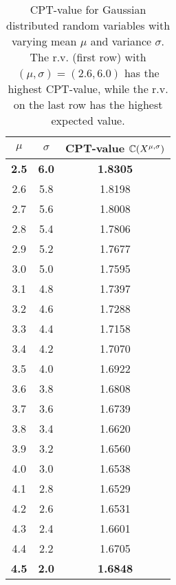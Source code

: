 \begin{table}
\centering
\begin{tabular}{|c|c|c|}
\toprule
$\mu$ & $\sigma$ & CPT-value $\mathbb{C}(X^{\mu,\sigma})$\\
\midrule
\textbf{2.5} & \textbf{6.0} & \textbf{1.8305}\\
2.6 & 5.8 & 1.8198\\
2.7 & 5.6 & 1.8008\\
2.8 & 5.4 & 1.7806\\
2.9 & 5.2 & 1.7677\\
3.0 & 5.0 & 1.7595\\
3.1 & 4.8 & 1.7397\\
3.2 & 4.6 & 1.7288\\
3.3 & 4.4 & 1.7158\\
3.4 & 4.2 & 1.7070\\
3.5 & 4.0 & 1.6922\\
3.6 & 3.8 & 1.6808\\
3.7 & 3.6 & 1.6739\\
3.8 & 3.4 & 1.6620\\
3.9 & 3.2 & 1.6560\\
4.0 & 3.0 & 1.6538\\
4.1 & 2.8 & 1.6529\\
4.2 & 2.6 & 1.6531\\
4.3 & 2.4 & 1.6601\\
4.4 & 2.2 & 1.6705\\
\textbf{4.5} & \textbf{2.0} & \textbf{1.6848}\\
\bottomrule
\end{tabular}
\caption{CPT-value for Gaussian distributed random variables with varying mean $\mu$ and variance $\sigma$. The r.v. (first row) with $(\mu,\sigma)=(2.6,6.0)$ has the highest CPT-value, while the r.v. on the last row has the highest expected value.}
\label{tab:gaussCPT}
\end{table}











